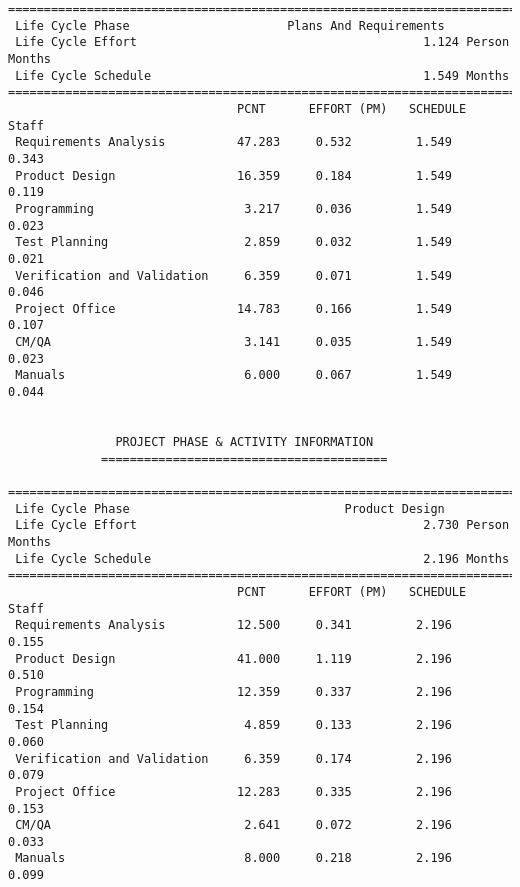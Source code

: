 \documentclass[11pt,a4paper,spanish,twoside]{report}
\begin{document}
{\begin{verbatim}
==============================================================================
 Life Cycle Phase                      Plans And Requirements
 Life Cycle Effort                                        1.124 Person Months
 Life Cycle Schedule                                      1.549 Months
==============================================================================
                                PCNT      EFFORT (PM)   SCHEDULE       Staff   
 Requirements Analysis          47.283     0.532         1.549        0.343
 Product Design                 16.359     0.184         1.549        0.119
 Programming                     3.217     0.036         1.549        0.023
 Test Planning                   2.859     0.032         1.549        0.021
 Verification and Validation     6.359     0.071         1.549        0.046
 Project Office                 14.783     0.166         1.549        0.107
 CM/QA                           3.141     0.035         1.549        0.023
 Manuals                         6.000     0.067         1.549        0.044


		       PROJECT PHASE & ACTIVITY INFORMATION
		     ========================================

==============================================================================
 Life Cycle Phase                              Product Design
 Life Cycle Effort                                        2.730 Person Months
 Life Cycle Schedule                                      2.196 Months
==============================================================================
                                PCNT      EFFORT (PM)   SCHEDULE       Staff   
 Requirements Analysis          12.500     0.341         2.196        0.155
 Product Design                 41.000     1.119         2.196        0.510
 Programming                    12.359     0.337         2.196        0.154
 Test Planning                   4.859     0.133         2.196        0.060
 Verification and Validation     6.359     0.174         2.196        0.079
 Project Office                 12.283     0.335         2.196        0.153
 CM/QA                           2.641     0.072         2.196        0.033
 Manuals                         8.000     0.218         2.196        0.099


\end{verbatim}}
\end{document}
